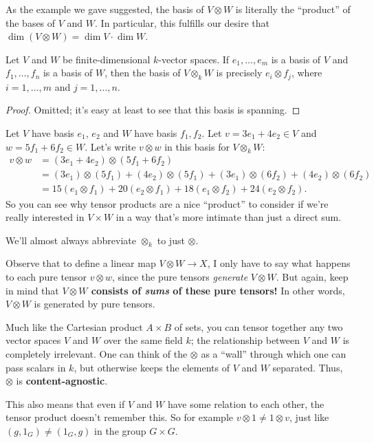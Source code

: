 As the example we gave suggested,
the basis of $V \otimes W$ is literally the ``product''
of the bases of $V$ and $W$.
In particular, this fulfills our desire that
$\dim (V \otimes W) = \dim V \cdot \dim W$.
\begin{proposition}
	Let $V$ and $W$ be finite-dimensional $k$-vector spaces.
	If $e_1, \dots, e_m$ is a basis of $V$ and $f_1, \dots, f_n$ is a basis of $W$,
	then the basis of $V \otimes_k W$
	is precisely $e_i \otimes f_j$, where $i=1,\dots,m$ and $j=1,\dots,n$.
\end{proposition}
\begin{proof}
	Omitted; it's easy at least to see that this basis is spanning.
\end{proof}

\begin{example}
	Let $V$ have basis $e_1$, $e_2$ and $W$ have basis $f_1, f_2$.
	Let $v = 3e_1 + 4e_2 \in V$ and $w = 5f_1 + 6f_2 \in W$.
	Let's write $v \otimes w$ in this basis for $V \otimes_k W$:
	\begin{align*}
		v \otimes w &= (3e_1+4e_2) \otimes (5f_1+6f_2) \\
		&= (3e_1) \otimes (5f_1) +  (4e_2) \otimes (5f_1)
		+ (3e_1) \otimes (6f_2) + (4e_2) \otimes (6f_2) \\
		&= 15 (e_1 \otimes f_1) + 20(e_2 \otimes f_1)
		+ 18 (e_1 \otimes f_2) + 24(e_2 \otimes f_2).
	\end{align*}
	So you can see why tensor products are a nice ``product'' to
	consider if we're really interested in $V \times W$
	in a way that's more intimate than just a direct sum.
\end{example}

\begin{abuse}
	We'll almost always abbreviate $\otimes_k$ to just $\otimes$.
\end{abuse}
\begin{remark}
	Observe that to define a linear map $V \otimes W \to X$,
	I only have to say what happens to each pure tensor $v \otimes w$,
	since the pure tensors \emph{generate} $V \otimes W$.
	But again, keep in mind that 
	\textbf{$V \otimes W$ consists of \emph{sums} of these pure tensors!}
	In other words, $V \otimes W$ is generated by pure tensors.
\end{remark}

\begin{remark}
	Much like the Cartesian product $A \times B$ of sets,
	you can tensor together any two vector spaces $V$ and $W$ over the same field $k$;
	the relationship between $V$ and $W$ is completely irrelevant.
	One can think of the $\otimes$ as a ``wall'' through which one can pass
	scalars in $k$, but otherwise keeps the elements of $V$ and $W$ separated.
	Thus, $\otimes$ is \textbf{content-agnostic}.

	This also means that even if $V$ and $W$ have some relation to each other,
	the tensor product doesn't remember this.
	So for example $v \otimes 1 \neq 1 \otimes v$,
	just like $(g,1_G) \neq (1_G,g)$ in the group $G \times G$.
\end{remark}

